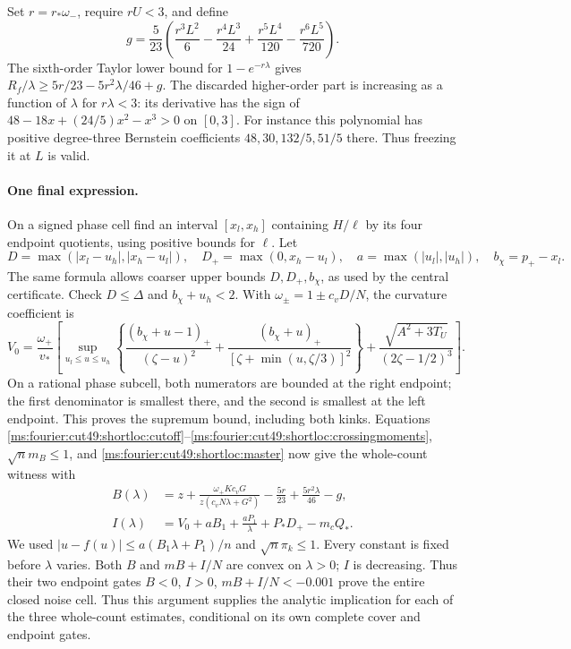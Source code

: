 Set $r=r_*\omega_-$, require $rU<3$, and define
\begin{equation}\label{ms:fourier:cut49:shortloc:gain}
 g=\frac5{23}\left(\frac{r^3L^2}{6}-\frac{r^4L^3}{24}
                     +\frac{r^5L^4}{120}-\frac{r^6L^5}{720}\right).
\end{equation}
The sixth-order Taylor lower bound for $1-e^{-r\lambda}$ gives
$R_f/\lambda\ge5r/23-5r^2\lambda/46+g$. The discarded higher-order
part is increasing as a function of $\lambda$ for $r\lambda<3$:
its derivative has the sign of $48-18x+(24/5)x^2-x^3>0$ on $[0,3]$.
For instance this polynomial has positive degree-three Bernstein
coefficients $48,30,132/5,51/5$ there. Thus freezing it at $L$ is valid.

\paragraph{One final expression.}
On a signed phase cell find an interval $[x_l,x_h]$ containing $H/\ell$
by its four endpoint quotients, using positive bounds for $\ell$.
Let
\[
 D=\max(|x_l-u_h|,|x_h-u_l|),\quad
 D_+=\max(0,x_h-u_l),\quad a=\max(|u_l|,|u_h|),\quad b_\chi=p_+-x_l.
\]
The same formula allows coarser upper bounds $D,D_+,b_\chi$, as used by
the central certificate. Check $D\le\Delta$ and $b_\chi+u_h<2$.
With $\omega_\pm=1\pm c_vD/N$, the curvature coefficient is
\begin{equation}\label{ms:fourier:cut49:shortloc:V}
 V_0=\frac{\omega_+}{v_*}\left[
 \sup_{u_l\le u\le u_h}\left\{
 \frac{(b_\chi+u-1)_+}{(\zeta-u)^2}
 +\frac{(b_\chi+u)_+}{[\zeta+\min(u,\zeta/3)]^2}\right\}
 +\frac{\sqrt{A^2+3T_U}}{(2\zeta-1/2)^3}\right].
\end{equation}
On a rational phase subcell, both numerators are bounded at the right
endpoint; the first denominator is smallest there, and the second is
smallest at the left endpoint. This proves the supremum bound, including
both kinks. Equations \eqref{ms:fourier:cut49:shortloc:cutoff}--\eqref{ms:fourier:cut49:shortloc:crossingmoments},
$\sqrt n m_B\le1$, and \eqref{ms:fourier:cut49:shortloc:master} now give the whole-count
witness with
\begin{align}\label{ms:fourier:cut49:shortloc:BI}
 B(\lambda)&=z+\frac{\omega_+Kc_vG}{z(c_vN\lambda+G^2)}
                      -\frac{5r}{23}+\frac{5r^2\lambda}{46}-g,\\
 I(\lambda)&=V_0+aB_1+\frac{aP_1}{\lambda}+P_*D_+-m_cQ_*.
 \nonumber
\end{align}
We used $|u-f(u)|\le a(B_1\lambda+P_1)/n$ and $\sqrt n\pi_k\le1$.
Every constant is fixed before $\lambda$ varies. Both $B$ and
$mB+I/N$ are convex on $\lambda>0$; $I$ is decreasing. Thus their two
endpoint gates $B<0$, $I>0$, $mB+I/N<-0.001$ prove the entire closed noise
cell. Thus this argument supplies the analytic implication for each of the three
whole-count estimates, conditional on its own complete cover and endpoint gates.


